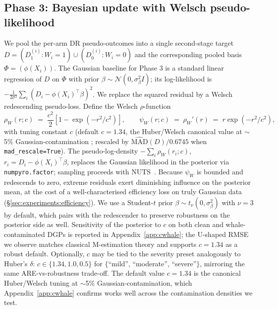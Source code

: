 \subsection{Phase 3: Bayesian update with Welsch pseudo-likelihood}
\label{sec:method:phase3}
We pool the per-arm DR pseudo-outcomes into a single second-stage
target $D = (D_1^{(i)} : W_i = 1) \cup (D_0^{(i)} : W_i = 0)$ and
the corresponding pooled basis $\Phi = (\phi(X_i))$. The Gaussian
baseline for Phase 3 is a standard linear regression of $D$ on
$\Phi$ with prior $\beta \sim \mathcal{N}(0, \sigma_\beta^2 I)$;
its log-likelihood is
$-\frac{1}{2\sigma^2} \sum_i (D_i - \phi(X_i)^\top \beta)^2$. We
replace the squared residual by a Welsch redescending
pseudo-loss. Define the Welsch $\rho$-function
\begin{equation}
  \rho_W(r; c) \;=\; \frac{c^2}{2}\left[1 - \exp(-r^2/c^2)\right],
  \qquad
  \psi_W(r; c) \;=\; \rho_W'(r) \;=\; r \exp(-r^2/c^2),
  \label{eq:welsch}
\end{equation}
with tuning constant $c$ (default $c = 1.34$, the Huber/Welsch
canonical value at $\sim$5\% Gaussian-contamination
\citep{huber2009robust}; rescaled by
$\widehat{\mathrm{MAD}}(D)/0.6745$ when
\texttt{mad\_rescale=True}). The pseudo-log-density $-\sum_i
\rho_W(r_i; c)$, $r_i = D_i - \phi(X_i)^\top \beta$, replaces the
Gaussian likelihood in the posterior via \texttt{numpyro.factor};
sampling proceeds with NUTS~\citep{hoffman2014no}. Because $\psi_W$
is bounded and redescends to zero, extreme residuals exert
diminishing influence on the posterior mean, at the cost of a
well-characterised efficiency loss on truly Gaussian data
(\S\ref{sec:experiments:efficiency}). We use a Student-$t$
prior $\beta \sim t_\nu(0, \sigma_\beta^2)$ with $\nu = 3$ by
default, which pairs with the redescender to preserve robustness on
the posterior side as well. Sensitivity of the posterior to $c$ on
both clean and whale-contaminated DGPs is reported in
Appendix~\ref{app:cwhale}; the U-shaped RMSE we observe matches
classical M-estimation theory and supports $c = 1.34$ as a robust
default. Optionally, $c$ may be tied to the severity preset
analogously to Huber's $\delta$: $c \in \{1.34, 1.0, 0.5\}$ for
$\{$``mild'', ``moderate'', ``severe''$\}$, mirroring the same
ARE-vs-robustness trade-off. The default value $c = 1.34$ is the
canonical Huber/Welsch tuning at $\sim$5\%
Gaussian-contamination, which Appendix~\ref{app:cwhale} confirms
works well across the contamination densities we test.

